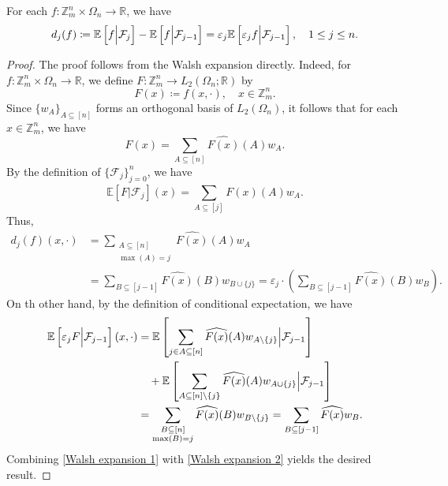 \documentclass[10pt,a4paper]{amsart}
\newcommand{\Z}{{\mathbb{Z}^{n}_{m}}}
\begin{document}
\begin{lem}\label{representation of martingale difference}
For each $f:\Z\times \Omega_{n}\to \mathbb{R}$, we have
\[
d_{j}(f)\coloneqq\mathbb{E}\left[f\Big{|}\mathcal{F}_{j}\right]-\mathbb{E}\left[f\Big{|}\mathcal{F}_{j-1}\right]=\varepsilon_{j}\mathbb{E}\left[\varepsilon_{j}f\Big{|}\mathcal{F}_{j-1}\right],\quad1\leq j\leq n.
\]
\end{lem}

\begin{proof}
The proof follows from the Walsh expansion directly. Indeed, for $f:\Z\times \Omega_{n}\to \mathbb{R}$, we define $F:\Z\to L_{2}(\Omega_{n};\mathbb{R})$ by
\[
F(x)\coloneqq f(x,\cdot),\quad x\in \Z.
\]
Since $\{w_{A}\}_{A\subseteq [n]}$ forms an orthogonal basis of $L_{2}(\Omega_{n})$, it follows that for each $x\in \Z$,  we have
\[
F(x)=\sum_{A\subseteq [n]}\widehat{F(x)}(A)w_{A}.
\]
By the definition of $\{\mathcal{F}_{j}\}_{j=0}^{n}$, we have
\[
\mathbb{E}[F|\mathcal{F}_{j}](x)=\sum_{A\subseteq [j]}\widehat{F(x)}(A)w_{A}.
\]
Thus,
\begin{equation}\label{Walsh expansion 1}
\begin{split}
d_{j}(f)(x,\cdot)&=\sum_{\substack{A\subseteq [n]\\\max(A)=j}}\widehat{F(x)}(A)w_{A}\\
&=\sum_{B\subseteq [j-1]}\widehat{F(x)}(B)w_{B\cup\{j\}}=\varepsilon_{j}\cdot\left(\sum_{B\subseteq [j-1]}\widehat{F(x)}(B)w_{B}\right).
\end{split}
\end{equation}
On th other hand, by the definition of conditional expectation, we have
\begin{equation}\label{Walsh expansion 2}
\begin{split}
\mathbb{E}\left[\varepsilon_{j} F\Big{|}\mathcal{F}_{j-1}\right](x,\cdot)&=\mathbb{E}\left[\sum_{j\in A\subseteq [n]}\widehat{F(x)}(A)w_{A\setminus\{j\}}\Big{|}\mathcal{F}_{j-1}\right]\\
&\quad +\mathbb{E}\left[\sum_{A\subseteq [n]\setminus\{j\}}\widehat{F(x)}(A)w_{A\cup\{j\}}\Big{|}\mathcal{F}_{j-1}\right]\\
&=\sum_{\substack{B\subseteq[n]\\\max(B)=j}}\widehat{F(x)}(B)w_{B\setminus\{j\}}=\sum_{B\subseteq [j-1]}\widehat{F(x)}w_{B}.
\end{split}
\end{equation}
Combining \eqref{Walsh expansion 1} with \eqref{Walsh expansion 2} yields the desired result.
\end{proof}
\end{document}
